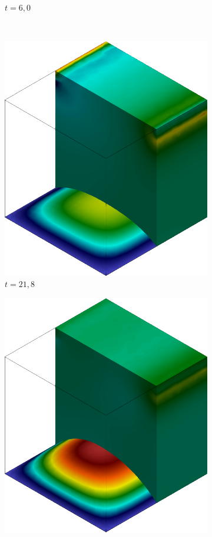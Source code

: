 \begin{figure}[h!]
\begin{subfigure}[b]{0.35\textwidth}
        \caption{$t=6,0$}
    \end{subfigure}\\
    \begin{subfigure}[b]{0.35\textwidth}
        \includegraphics[width=\linewidth]{Figuras/FSI-Cavity3D/p21-8.png}
        \caption{$t=21,8$}
    \end{subfigure}
    \begin{subfigure}[b]{0.35\textwidth}
        \includegraphics[width=\linewidth]{Figuras/FSI-Cavity3D/p24-3.png}

\end{subfigure}
\end{figure}

